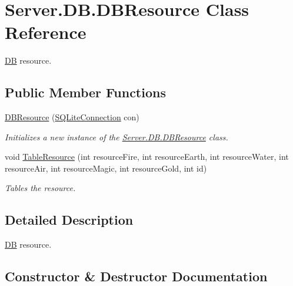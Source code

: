 \hypertarget{classServer_1_1DB_1_1DBResource}{}\section{Server.\+D\+B.\+D\+B\+Resource Class Reference}
\label{classServer_1_1DB_1_1DBResource}


\hyperlink{namespaceServer_1_1DB}{D\+B} resource.  


\subsection*{Public Member Functions}
\begin{DoxyCompactItemize}
\item 
\hyperlink{classServer_1_1DB_1_1DBResource_a5fb8e10eb16e1ec061d5ff52e2bbd1f4}{D\+B\+Resource} (\hyperlink{classSQLite_1_1SQLiteConnection}{S\+Q\+Lite\+Connection} con)
\begin{DoxyCompactList}\small\item\em Initializes a new instance of the \hyperlink{classServer_1_1DB_1_1DBResource}{Server.\+D\+B.\+D\+B\+Resource} class. \end{DoxyCompactList}\item 
void \hyperlink{classServer_1_1DB_1_1DBResource_a245bfbc84b1754d90d417e4e819f327b}{Table\+Resource} (int resource\+Fire, int resource\+Earth, int resource\+Water, int resource\+Air, int resource\+Magic, int resource\+Gold, int id)
\begin{DoxyCompactList}\small\item\em Tables the resource. \end{DoxyCompactList}\end{DoxyCompactItemize}


\subsection{Detailed Description}
\hyperlink{namespaceServer_1_1DB}{D\+B} resource. 



\subsection{Constructor \& Destructor Documentation}
\hypertarget{classServer_1_1DB_1_1DBResource_a5fb8e10eb16e1ec061d5ff52e2bbd1f4}{}
